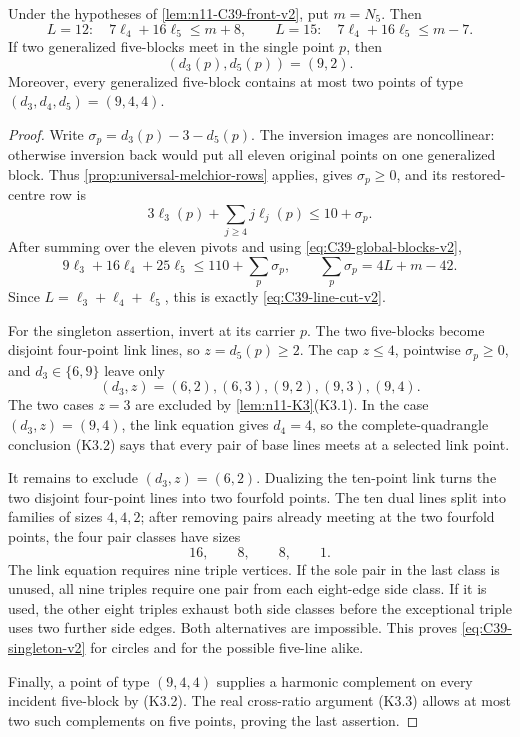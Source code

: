 \begin{lemma}
\label{lem:n11-C39-interfaces-v2}
Under the hypotheses of \cref{lem:n11-C39-front-v2}, put \(m=N_5\).  Then
\begin{equation}\label{eq:C39-line-cut-v2}
 L=12:\quad7\ell_4+16\ell_5\le m+8,
 \qquad
 L=15:\quad7\ell_4+16\ell_5\le m-7.
\end{equation}
If two generalized five-blocks meet in the single point \(p\), then
\begin{equation}\label{eq:C39-singleton-v2}
 (d_3(p),d_5(p))=(9,2).
\end{equation}
Moreover, every generalized five-block contains at most two points of type
\((d_3,d_4,d_5)=(9,4,4)\).
\end{lemma}

\begin{proof}
Write \(\sigma_p=d_3(p)-3-d_5(p)\).  The inversion images are noncollinear:
otherwise inversion back would put all eleven original points on one
generalized block.  Thus \cref{prop:universal-melchior-rows} applies,
gives \(\sigma_p\ge0\), and its restored-centre row is
\[
 3\ell_3(p)+\sum_{j\ge4}j\ell_j(p)\le10+\sigma_p.
\]
After summing over the eleven pivots and using
\eqref{eq:C39-global-blocks-v2},
\[
 9\ell_3+16\ell_4+25\ell_5
 \le110+\sum_p\sigma_p,
 \qquad \sum_p\sigma_p=4L+m-42.
\]
Since \(L=\ell_3+\ell_4+\ell_5\), this is exactly
\eqref{eq:C39-line-cut-v2}.

For the singleton assertion, invert at its carrier \(p\).  The two
five-blocks become disjoint four-point link lines, so \(z=d_5(p)\ge2\).
The cap \(z\le4\), pointwise \(\sigma_p\ge0\), and
\(d_3\in\{6,9\}\) leave only
\[
 (d_3,z)=(6,2),(6,3),(9,2),(9,3),(9,4).
\]
The two cases \(z=3\) are excluded by \cref{lem:n11-K3}(K3.1).  In the
case \((d_3,z)=(9,4)\), the link equation gives \(d_4=4\), so the
complete-quadrangle conclusion (K3.2) says that every pair of base lines
meets at a selected link point.

It remains to exclude \((d_3,z)=(6,2)\).  Dualizing the ten-point link turns
the two disjoint four-point lines into two fourfold points.  The ten dual
lines split into families of sizes \(4,4,2\); after removing pairs already
meeting at the two fourfold points, the four pair classes have sizes
\[
 16,\qquad8,\qquad8,\qquad1.
\]
The link equation requires nine triple vertices.  If the sole pair in the
last class is unused, all nine triples require one pair from each eight-edge
side class.  If it is used, the other eight triples exhaust both side
classes before the exceptional triple uses two further side edges.  Both
alternatives are impossible.  This proves \eqref{eq:C39-singleton-v2} for
circles and for the possible five-line alike.

Finally, a point of type \((9,4,4)\) supplies a harmonic complement on every
incident five-block by (K3.2).  The real cross-ratio argument (K3.3) allows
at most two such complements on five points, proving the last assertion.
\end{proof}

